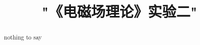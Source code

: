 \documentclass[10pt, technote]{IEEEtran}
\begin{document}
    \title{"《电磁场理论》实验二"}
    \begin{abstract}
        nothing to say
    \end{abstract}
\end{document}
